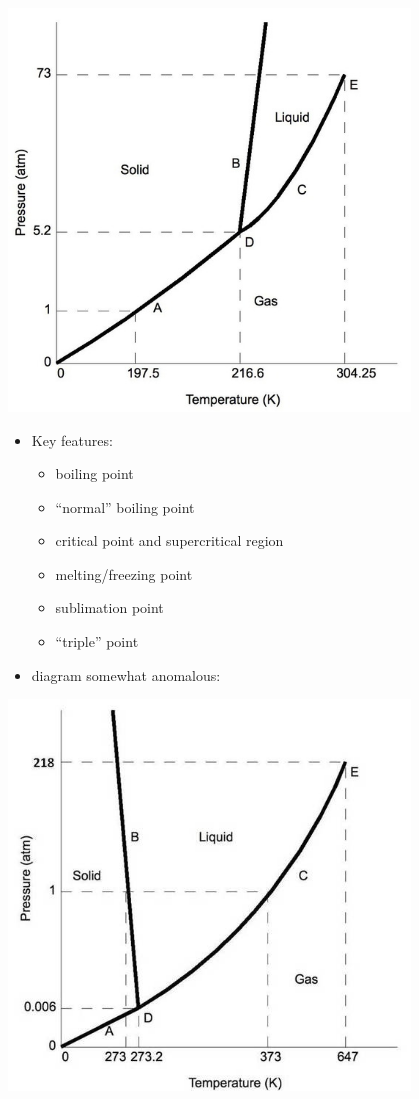 \documentclass[11pt]{article}
\begin{document}
\includegraphics[width=0.8\textwidth]{./figs/CO2-Phase-Diagram.jpg}

\begin{itemize}
\item Key features:
\begin{itemize}
\item boiling point
\item ``normal'' boiling point
\item critical point and supercritical region
\item melting/freezing point
\item sublimation point
\item ``triple'' point
\end{itemize}

\item {} diagram somewhat anomalous:
\end{itemize}

\includegraphics[width=0.8\textwidth]{./figs/H2O-Phase-Diagram.jpg}
\end{document}
